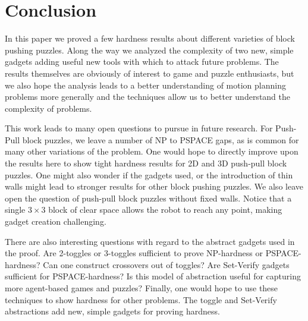 \section{Conclusion}
In this paper we proved a few hardness results about different varieties of block pushing puzzles. Along the way we analyzed the complexity of two new, simple gadgets adding useful new tools with which to attack future problems. The results themselves are obviously of interest to game and puzzle enthusiasts, but we also hope the analysis leads to a better understanding of motion planning problems more generally and the techniques allow us to better understand the complexity of problems.

This work leads to many open questions to pursue in future research. For Push-Pull block puzzles, we leave a number of NP to PSPACE gaps, as is common for many other variations of the problem. One would hope to directly improve upon the results here to show tight hardness results for 2D and 3D push-pull block puzzles. One might also wonder if the gadgets used, or the introduction of thin walls might lead to stronger results for other block pushing puzzles. We also leave open the question of push-pull block puzzles without fixed walls. Notice that a single $3\times3$ block of clear space allows the robot to reach any point, making gadget creation challenging.

There are also interesting questions with regard to the abstract gadgets used in the proof. Are 2-toggles or 3-toggles sufficient to prove NP-hardness or PSPACE-hardness? Can one construct crossovers out of toggles? Are Set-Verify gadgets sufficient for PSPACE-hardness? Is this model of abstraction useful for capturing more agent-based games and puzzles? Finally, one would hope to use these techniques to show hardness for other problems. The toggle and Set-Verify abstractions add new, simple gadgets for proving hardness. 
%
%
